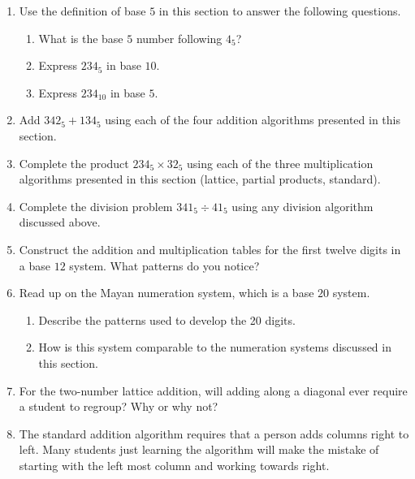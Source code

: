 \documentclass[
]{book}
\providecommand{\tightlist}{%
  \setlength{\itemsep}{0pt}\setlength{\parskip}{0pt}}
\theoremstyle{definition}
\theoremstyle{definition}
\theoremstyle{definition}
\theoremstyle{remark}
\begin{document}
\begin{enumerate}
\def\labelenumi{\arabic{enumi}.}
\item
  Use the definition of base \(5\) in this section to answer the following questions.

  \begin{enumerate}
  \def\labelenumii{\alph{enumii}.}
  \tightlist
  \item
    What is the base \(5\) number following \(4_{5}\)?
  \item
    Express \(234_{5}\) in base \(10\).
  \item
    Express \(234_{10}\) in base \(5\).
  \end{enumerate}
\item
  Add \(342_5+134_5\) using each of the four addition algorithms presented in this section.
\item
  Complete the product \(234_5 \times 32_5\) using each of the three multiplication algorithms presented in this section (lattice, partial products, standard).
\item
  Complete the division problem \(341_5 \div 41_5\) using any division algorithm discussed above.
\item
  Construct the addition and multiplication tables for the first twelve digits in a base \(12\) system. What patterns do you notice?
\item
  Read up on the Mayan numeration system, which is a base \(20\) system.

  \begin{enumerate}
  \def\labelenumii{\alph{enumii}.}
  \tightlist
  \item
    Describe the patterns used to develop the 20 digits.
  \item
    How is this system comparable to the numeration systems discussed in this section.
  \end{enumerate}
\item
  For the two-number lattice addition, will adding along a diagonal ever require a student to regroup? Why or why not?
\item
  The standard addition algorithm requires that a person adds columns right to left. Many students just learning the algorithm will make the mistake of starting with the left most column and working towards right.


\end{enumerate}
\end{document}
